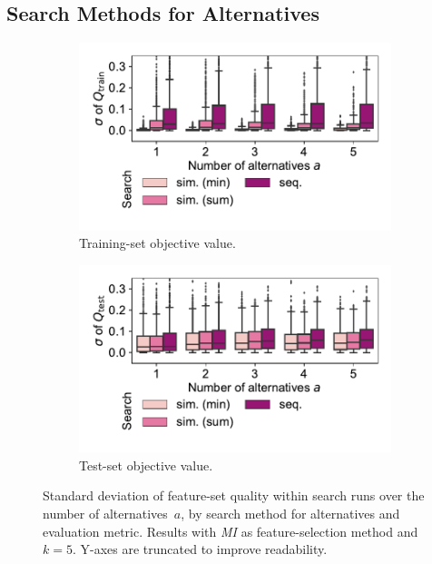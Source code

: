 \documentclass[iicol, sn-basic, Numbered]{sn-jnl} %
\theoremstyle{plain}
\theoremstyle{definition}
\begin{document}
\subsection{Search Methods for Alternatives}
\label{sec:afs:evaluation:search-method}

\begin{figure}[t]
	\centering
	\begin{subfigure}[t]{0.49\textwidth}
		\centering
		\includegraphics[width=\textwidth, trim=15 20 10 10, clip]{plots/afs-impact-search-stddev-train-objective.pdf}
		\caption{Training-set objective value.}
		\label{fig:afs:impact-search-stddev-train-objective}
	\end{subfigure}
	\hfill
	\begin{subfigure}[t]{0.49\textwidth}
		\centering
		\includegraphics[width=\textwidth, trim=15 20 10 10, clip]{plots/afs-impact-search-stddev-test-objective.pdf}
		\caption{Test-set objective value.}
		\label{fig:afs:impact-search-stddev-test-objective}
	\end{subfigure}
	\caption{
		Standard deviation of feature-set quality within search runs over the number of alternatives~$a$, by search method for alternatives and evaluation metric.
		Results with \emph{MI} as feature-selection method and $k=5$.
		Y-axes are truncated to improve readability.
	}
	\label{fig:afs:impact-search-stddev}
\end{figure}
\end{document}
